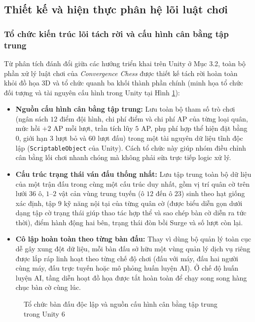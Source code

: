 \subsection{Thiết kế và hiện thực phân hệ lõi luật chơi}

\subsubsection{Tổ chức kiến trúc lõi tách rời và cấu hình cân bằng tập trung}
Từ phân tích đánh đổi giữa các hướng triển khai trên Unity ở Mục 3.2, toàn bộ phần xử lý luật chơi của \textit{Convergence Chess} được thiết kế tách rời hoàn toàn khỏi đồ họa 3D và tổ chức quanh ba khối thành phần chính (minh họa tổ chức đối tượng và tài nguyên cấu hình trong Unity tại Hình \ref{fig:unity_core_config}):
\begin{itemize}
    \item \textbf{Nguồn cấu hình cân bằng tập trung:} Lưu toàn bộ tham số trò chơi (ngân sách $12$ điểm đội hình, chi phí điểm và chi phí AP của từng loại quân, mức hồi $+2$ AP mỗi lượt, trần tích lũy $5$ AP, phụ phí hợp thể hiện đặt bằng $0$, giới hạn $3$ lượt bỏ và $60$ lượt đấu) trong một tài nguyên dữ liệu tĩnh độc lập (\texttt{ScriptableObject} của Unity). Cách tổ chức này giúp nhóm điều chỉnh cân bằng lối chơi nhanh chóng mà không phải sửa trực tiếp logic xử lý.
    \item \textbf{Cấu trúc trạng thái ván đấu thống nhất:} Lưu tập trung toàn bộ dữ liệu của một trận đấu trong cùng một cấu trúc duy nhất, gồm vị trí quân cờ trên lưới $36$ ô, $1$--$2$ vật cản vùng trung tuyến (ô $12$ đến ô $23$) sinh theo hạt giống xác định, tập $9$ kỹ năng nội tại của từng quân cờ (được biểu diễn gọn dưới dạng tập cờ trạng thái giúp thao tác hợp thể và sao chép bàn cờ diễn ra tức thời), điểm hành động hai bên, trạng thái đòn bồi Surge và số lượt còn lại.
    \item \textbf{Cô lập hoàn toàn theo từng bàn đấu:} Thay vì dùng bộ quản lý toàn cục dễ gây xung đột dữ liệu, mỗi bàn đấu sở hữu một vùng quản lý dịch vụ riêng được lắp ráp linh hoạt theo từng chế độ chơi (đấu với máy, đấu hai người cùng máy, đấu trực tuyến hoặc mô phỏng huấn luyện AI). Ở chế độ huấn luyện AI, tầng diễn hoạt đồ họa được tắt hoàn toàn để chạy song song hàng chục bàn cờ cùng lúc.
\end{itemize}

\begin{figure}[H]
    \centering
    \caption{Tổ chức bàn đấu độc lập và nguồn cấu hình cân bằng tập trung trong Unity 6}
    \label{fig:unity_core_config}
\end{figure}

